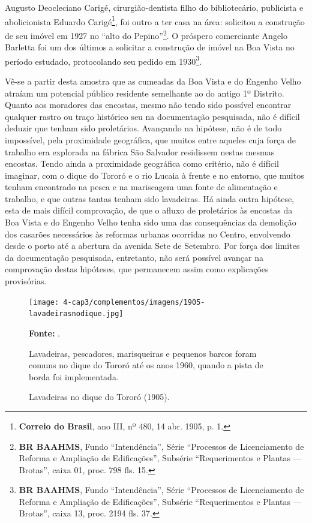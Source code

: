 Augusto Deocleciano Carigé, cirurgião-dentista filho do bibliotecário, publicista e abolicionista Eduardo Carigé\footnote{\textbf{Correio do Brasil}, ano III, nº 480, 14 abr. 1905, p. 1.}, foi outro a ter casa na área: solicitou a construção de seu imóvel em 1927 no ``alto do Pepino''\footnote{\textbf{BR BAAHMS}, Fundo ``Intendência'', Série ``Processos de Licenciamento de Reforma e Ampliação de Edificações'', Subsérie ``Requerimentos e Plantas --- Brotas'', caixa 01, proc. 798 fls. 15.}. O próspero comerciante Angelo Barletta foi um dos últimos a solicitar a construção de imóvel na Boa Vista no período estudado, protocolando seu pedido em 1930\footnote{\textbf{BR BAAHMS}, Fundo ``Intendência'', Série ``Processos de Licenciamento de Reforma e Ampliação de Edificações'', Subsérie ``Requerimentos e Plantas --- Brotas'', caixa 13, proc. 2194 fls. 37.}.

Vê-se a partir desta amostra que as cumeadas da Boa Vista e do Engenho Velho atraíam um potencial público residente semelhante ao do antigo 1º Distrito. Quanto aos moradores das encostas, mesmo não tendo sido possível encontrar qualquer rastro ou traço histórico seu na documentação pesquisada, não é difícil deduzir que tenham sido proletários. Avançando na hipótese, não é de todo impossível, pela proximidade geográfica, que muitos entre aqueles cuja força de trabalho era explorada na fábrica São Salvador residissem nestas mesmas encostas. Tendo ainda a proximidade geográfica como critério, não é difícil imaginar, com o dique do Tororó e o rio Lucaia à frente e no entorno, que muitos tenham encontrado na pesca e na mariscagem uma fonte de alimentação e trabalho, e que outras tantas tenham sido lavadeiras. Há ainda outra hipótese, esta de mais difícil comprovação, de que o afluxo de proletários às encostas da Boa Vista e do Engenho Velho tenha sido uma das consequências da demolição dos casarões necessários às reformas urbanas ocorridas no Centro, envolvendo desde o porto até a abertura da avenida Sete de Setembro. Por força dos limites da documentação pesquisada, entretanto, não será possível avançar na comprovação destas hipóteses, que permanecem assim como explicações provisórias.

\begin{figure}[!h]
\centering
\caption{Lavadeiras no dique do Tororó (1905).}
\texttt{[image: 4-cap3/complementos/imagens/1905-lavadeirasnodique.jpg]}{\footnotesize \par \textbf{Fonte:} . \par Lavadeiras, pescadores, marisqueiras e pequenos barcos foram comuns no dique do Tororó até os anos 1960, quando a pista de borda foi implementada.}
\label{fig:1905-lavadeirasnodique}
\end{figure}

